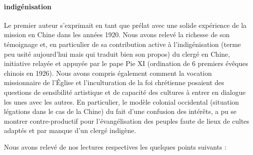\paragraph{indigénisation}
Le premier auteur s’exprimait en tant que prélat avec une solide expérience de la mission en Chine dans les années 1920. Nous avons relevé la richesse de son témoignage et, en particulier de sa contribution active à l’indigénisation (terme peu usité aujourd’hui mais qui traduit bien son propos) du clergé en Chine, initiative relayée et appuyée par le pape Pie XI (ordination de 6 premiers évêques chinois en 1926). Nous avons compris également comment la vocation missionnaire de l’Église et l’inculturation de la foi chrétienne posaient des questions de sensibilité artistique et de capacité des cultures à entrer en dialogue les unes avec les autres. En particulier, le modèle colonial occidental (situation légations dans le cas de la Chine) du fait d’une confusion des intérêts, a pu se montrer contre-productif pour l’évangélisation des peuples faute de lieux de cultes adaptés et par manque d’un clergé indigène.

Nous avons relevé de nos lectures respectives les quelques points suivants :

